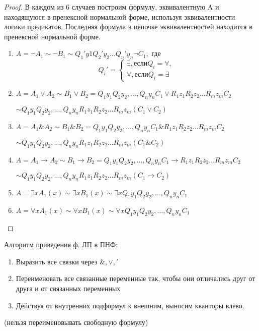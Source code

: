 \documentclass[a4paper]{article}
\theoremstyle{definition}
\theoremstyle{remark}
\begin{document}
\begin{proof}
        В каждом из 6 случаев построим формулу, эквивалентную A и 
        находящуюся в пренексной нормальной форме, используя эквивалентности 
        логики предикатов. Последняя формула в цепочке эквивалентностей находится в
        пренексной нормальной форме.
        \begin{enumerate}
            \item 
            $A = \neg A_1 \sim \neg B_1 \sim Q_1'y1 Q_2' y_2 \dots Q_n' y_n \neg C_1,$ где
            \begin{equation*}
                Q_i' = 
                \begin{cases}
                    \exists, \text{если} Q_i = \forall, \\
                    \forall, \text{если} Q_i = \exists
                \end{cases}
            \end{equation*}
            \item 
            $A = A_1 \vee A_2 \sim B_1 \vee B_2 = Q_1 y_1 Q_2 y_2, \dots, Q_n y_n C_1 \vee R_1z_1R_2z_2\dots R_mz_m C_2$

            $\sim Q_1 y_1 Q_2 y_2, \dots, Q_n y_n R_1z_1R_2z_2\dots R_mz_m (C_1 \vee C_2)$
            \item
            $A = A_1 \& A_2 \sim B_1 \& B_2 = Q_1 y_1 Q_2 y_2, \dots, Q_n y_n C_1 \& R_1z_1R_2z_2\dots R_mz_m C_2$

            $\sim Q_1 y_1 Q_2 y_2, \dots, Q_n y_n R_1z_1R_2z_2\dots R_mz_m (C_1 \& C_2)$
            \item
            $A = A_1 \to A_2 \sim B_1 \to B_2 = Q_1 y_1 Q_2 y_2, \dots, Q_n y_n C_1 \to R_1z_1R_2z_2\dots R_mz_m C_2$

            $\sim Q_1 y_1 Q_2 y_2, \dots, Q_n y_n R_1z_1R_2z_2\dots R_mz_m (C_1 \to C_2)$
            \item
            $A = \exists x A_1(x) \sim \exists x B_1(x) \sim \exists x Q_1 y_1 Q_2 y_2, \dots, Q_n y_n C_1$
            \item 
            $A = \forall x A_1(x) \sim \forall x B_1(x) \sim \forall x Q_1 y_1 Q_2 y_2, \dots, Q_n y_n C_1$
        \end{enumerate}
    \end{proof}

    Алгоритм приведения ф. ЛП в ПНФ:
    \begin{enumerate}
        \item Выразить все связки через $\&, \vee, '$
        \item Переименовать все связанные переменные так, чтобы они отличались друг от друга и от связанных переменных
        \item Действуя от внутренних подформул к внешним, выносим кванторы влево.
    \end{enumerate}
    (нельзя переименовывать свободную формулу)
\end{document}

